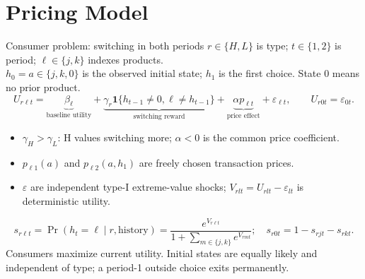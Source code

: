 \documentclass[aspectratio=169,11pt]{beamer}
\begin{document}
\section{Pricing Model}
\begin{frame}[label=pricing-setup]{Consumer problem: switching in both periods}
\small\setlength{\parskip}{3pt}
$r\in\{H,L\}$ is type; $t\in\{1,2\}$ is period; $\ell\in\{j,k\}$ indexes products.\\
$h_0=a\in\{j,k,0\}$ is the observed initial state; $h_1$ is the first choice. State $0$ means no prior product.
\[
U_{r\ell t}=\underbrace{\beta_\ell}_{\text{baseline utility}}
+\underbrace{\gamma_r\mathbf1\{h_{t-1}\ne0,\ell\ne h_{t-1}\}}_{\text{switching reward}}
+\underbrace{\alpha p_{\ell t}}_{\text{price effect}}+\varepsilon_{\ell t},\qquad U_{r0t}=\varepsilon_{0t}.
\]
\begin{itemize}
\item $\gamma_H>\gamma_L$: H values switching more; $\alpha<0$ is the common price coefficient.
\item $p_{\ell1}(a)$ and $p_{\ell2}(a,h_1)$ are freely chosen transaction prices.
  \item $\varepsilon$ are independent type-I extreme-value shocks; $V_{rlt}=U_{rlt}-\varepsilon_{lt}$ is deterministic utility.
\end{itemize}
\[
s_{r\ell t}=\Pr(h_t=\ell\mid r,\text{history})=
\frac{e^{V_{r\ell t}}}{1+\sum_{m\in\{j,k\}}e^{V_{rmt}}};
\quad s_{r0t}=1-s_{rjt}-s_{rkt}.
\]
\footnotesize Consumers maximize current utility. Initial states are equally likely and independent of type; a period-1 outside choice exits permanently.
\end{frame}
\end{document}
